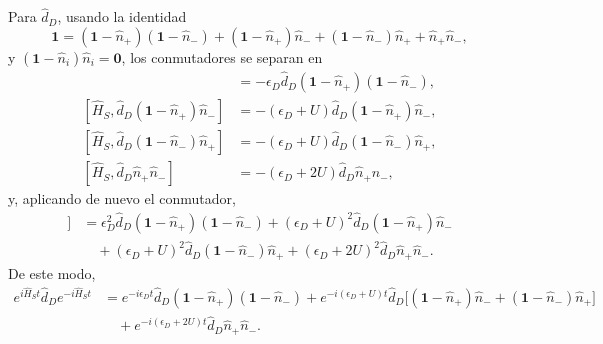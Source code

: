 \begin{appendixs}
Para $\hat{d}_{D}$, usando la identidad
\[
\mathbf{1} = (\mathbf{1} - \hat{n}_{+})(\mathbf{1}-\hat{n}_{-}) + (\mathbf{1} - \hat{n}_{+})\hat{n}_{-} + (\mathbf{1} - \hat{n}_{-})\hat{n}_{+} + \hat{n}_{+}\hat{n}_{-},
\]
y $(\mathbf{1}-\hat{n}_{i})\hat{n}_{i}=\mathbf{0}$, los conmutadores se separan en
\begin{align*}
    [\hat{H}_{S},\hat{d}_{D}(\mathbf{1}-\hat{n}_{+})(\mathbf{1} - \hat{n}_{-})] & = - \epsilon_{D}\hat{d}_{D}(\mathbf{1}-\hat{n}_{+})(\mathbf{1} - \hat{n}_{-}), \\
    [\hat{H}_{S},\hat{d}_{D}(\mathbf{1}-\hat{n}_{+})\hat{n}_{-}] & = - (\epsilon_{D} + U)\hat{d}_{D}(\mathbf{1} - \hat{n}_{+})\hat{n}_{-}, \\
    [\hat{H}_{S},\hat{d}_{D}(\mathbf{1}-\hat{n}_{-})\hat{n}_{+}] & = - (\epsilon_{D} + U)\hat{d}_{D}(\mathbf{1} - \hat{n}_{-})\hat{n}_{+}, \\
    [\hat{H}_{S},\hat{d}_{D}\hat{n}_{+}\hat{n}_{-}] & = - (\epsilon_{D} + 2U)\hat{d}_{D}\hat{n}_{+}\hat{n}_{-},
\end{align*}
y, aplicando de nuevo el conmutador,
\begin{align*}
    [\hat{H}_{S},[\hat{H}_{S},\hat{d}_{D}]] & =
    \epsilon_{D}^{2}\hat{d}_{D}(\mathbf{1} - \hat{n}_{+}) (\mathbf{1} - \hat{n}_{-})
    + (\epsilon_{D} + U)^{2}\hat{d}_{D}(\mathbf{1} - \hat{n}_{+})\hat{n}_{-} \\
    & \quad + (\epsilon_{D}+U)^{2}\hat{d}_{D}(\mathbf{1} - \hat{n}_{-})\hat{n}_{+}
    + (\epsilon_{D} + 2U)^{2}\hat{d}_{D}\hat{n}_{+}\hat{n}_{-}.
\end{align*}
De este modo,
\begin{align*}
    e^{i \hat{H}_{S}t}\hat{d}_{D}e^{-i\hat{H}_{S}t}  & =
    e^{-i\epsilon_{D}t} \hat{d}_{D}(\mathbf{1} - \hat{n}_{+}) (\mathbf{1} - \hat{n}_{-})
    +  e^{-i(\epsilon_{D}+U)t} \hat{d}_{D}\big[(\mathbf{1} - \hat{n}_{+})\hat{n}_{-} + (\mathbf{1} - \hat{n}_{-})\hat{n}_{+}\big] \\
    & \quad + e^{-i(\epsilon_{D} + 2U)t}\hat{d}_{D} \hat{n}_{+}\hat{n}_{-}.
\end{align*}


\end{appendixs}
